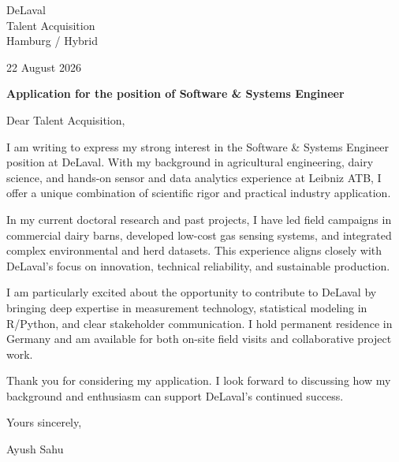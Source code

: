 \documentclass[10pt,a4paper]{article}
\begin{document}

DeLaval\\

Talent Acquisition\\

Hamburg / Hybrid

\vspace{10pt}
22 August 2026

\vspace{10pt}
\textbf{Application for the position of Software \& Systems Engineer}


\vspace{8pt}
Dear Talent Acquisition,


I am writing to express my strong interest in the Software \& Systems Engineer position at DeLaval. With my background in agricultural engineering, dairy science, and hands-on sensor and data analytics experience at Leibniz ATB, I offer a unique combination of scientific rigor and practical industry application.

\vspace{4pt}

In my current doctoral research and past projects, I have led field campaigns in commercial dairy barns, developed low-cost gas sensing systems, and integrated complex environmental and herd datasets. This experience aligns closely with DeLaval's focus on innovation, technical reliability, and sustainable production.

\vspace{4pt}

I am particularly excited about the opportunity to contribute to DeLaval by bringing deep expertise in measurement technology, statistical modeling in R/Python, and clear stakeholder communication. I hold permanent residence in Germany and am available for both on-site field visits and collaborative project work.

\vspace{4pt}

Thank you for considering my application. I look forward to discussing how my background and enthusiasm can support DeLaval's continued success.

\vspace{4pt}


Yours sincerely,

\vspace{14pt}
Ayush Sahu
\end{document}
